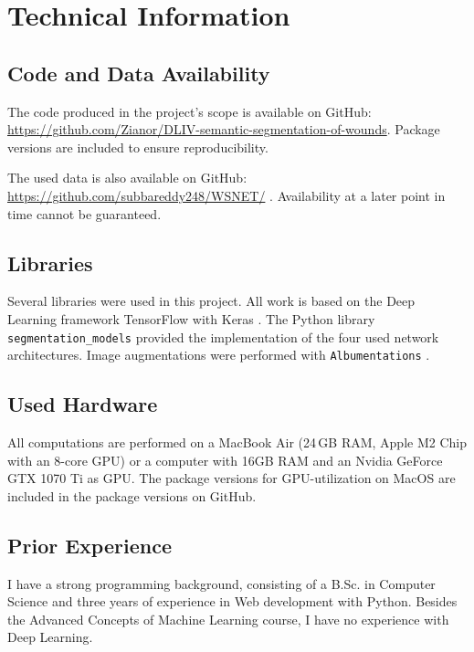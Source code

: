 \section{Technical Information}

\subsection{Code and Data Availability}

The code produced in the project's scope is available on GitHub: \url{https://github.com/Zianor/DLIV-semantic-segmentation-of-wounds}. Package versions are included to ensure reproducibility.

The used data is also available on GitHub:
\url{https://github.com/subbareddy248/WSNET/} \cite{Oota_2021_WACV, Oota_2023_WACV}. Availability at a later point in time cannot be guaranteed.

\subsection{Libraries}

Several libraries were used in this project. All work is based on the Deep Learning framework TensorFlow with Keras \cite{tensorflow2015-whitepaper, chollet2015keras}. The Python library \texttt{segmentation\_models} \cite{SegmentationModels} provided the implementation of the four used network architectures. Image augmentations were performed with \texttt{Albumentations} \cite{albumentations}.

\subsection{Used Hardware}

All computations are performed on a MacBook Air (24\,GB RAM, Apple M2 Chip with an 8-core GPU) or a computer with 16GB RAM and an Nvidia GeForce GTX 1070 Ti as GPU. The package versions for GPU-utilization on MacOS are included in the package versions on GitHub.

\subsection{Prior Experience}

I have a strong programming background, consisting of a B.Sc. in Computer Science and three years of experience in Web development with Python. Besides the Advanced Concepts of Machine Learning course, I have no experience with Deep Learning.

